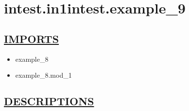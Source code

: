 \chapter*{intest.in1intest.example\_9}
\hypertarget{ecldoc:toc:intest.in1intest.example_9}{}

\section*{\underline{IMPORTS}}
\begin{itemize}
\item example\_8
\item example\_8.mod\_1
\end{itemize}

\section*{\underline{DESCRIPTIONS}}
